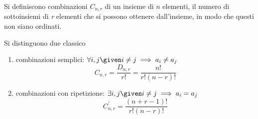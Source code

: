 \documentclass{subfiles}
\begin{document}
\begin{Definition*}
    Si definiscono combinazioni \(C_{n, r}\) di un insieme di \(n\) elementi, il numero di sottoinsiemi di \emph{r} elementi che si possono ottenere dall'insieme,
    in modo che questi non siano ordinati.
\end{Definition*}

Si distinguono due classico
\begin{enumerate}
    \item combinazioni semplici: \(\forall i, j \given i \neq j \implies a_{i} \neq a_{j}\)
          \[
              C_{n, r} = \frac{D_{n, r}}{r!} = \frac{n!}{r! (n - r)!}
          \]
    \item combinazioni con ripetizione: \(\exists i, j \given i \neq j \implies a_{i} = a_{j}\)
          \[
              C_{n, r}^{'} = \frac{(n + r - 1)!}{r!(n - r)!}
          \]
\end{enumerate}
\end{document}
